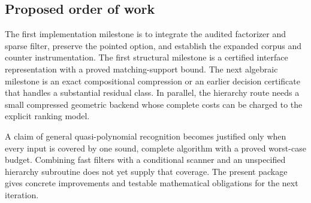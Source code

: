 \subsection{Proposed order of work}

The first implementation milestone is to integrate the audited factorizer
and sparse filter, preserve the pointed option, and establish the expanded
corpus and counter instrumentation.  The first structural milestone is a
certified interface representation with a proved matching-support bound.
The next algebraic milestone is an exact compositional compression or an
earlier decision certificate that handles a substantial residual class.
In parallel, the hierarchy route needs a small compressed geometric backend
whose complete costs can be charged to the explicit ranking model.

A claim of general quasi-polynomial recognition becomes justified only when
every input is covered by one sound, complete algorithm with a proved
worst-case budget.  Combining fast filters with a conditional scanner and
an unspecified hierarchy subroutine does not yet supply that coverage.
The present package gives concrete improvements and testable mathematical
obligations for the next iteration.
